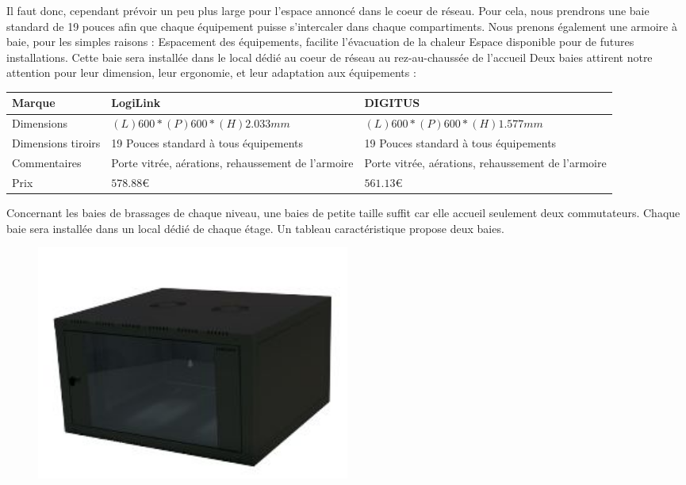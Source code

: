 Il faut donc, cependant prévoir un peu plus large pour l'espace annoncé dans le coeur de réseau. Pour cela, nous prendrons une baie standard de 19 pouces afin que chaque équipement puisse s'intercaler dans chaque compartiments. Nous prenons également une armoire à baie, pour les simples raisons :
Espacement des équipements, facilite l'évacuation de la chaleur
Espace disponible pour de futures installations.
Cette baie sera installée dans le local dédié au coeur de réseau au rez-au-chaussée de l'accueil
Deux baies attirent notre attention pour leur dimension, leur ergonomie, et leur adaptation aux équipements :

    \begin{center}
        \begin{tabular}{|l|p{5cm}|p{5cm}|}
          \hline
            Marque  & LogiLink
    &   DIGITUS
 \\
          \hline
Dimensions
  &
$(L)600 * (P)600 * (H)2.033 mm$
    & $ (L)600 * (P)600 * (H)1.577 mm $

 \\
          \hline
Dimensions tiroirs
  & 19 Pouces standard à tous équipements
    & 19 Pouces standard à tous équipements
 \\
          \hline
            Commentaires   & Porte vitrée, aérations, rehaussement de l'armoire & Porte vitrée, aérations, rehaussement de l'armoire
                  \\
        \hline
            Prix &
$ 578.88 \euro   $
    &
$ 561.13 \euro   $
 \\
          \hline
        \end{tabular}
    \end{center}

Concernant les baies de brassages de chaque niveau, une baies de petite taille suffit car elle accueil seulement deux commutateurs.
Chaque baie sera installée dans un local dédié de chaque étage. Un tableau caractéristique propose deux baies.

\begin{figure}[!ht]
    \center
    \includegraphics[width=0.5\textwidth]{./images/25.png}
\end{figure}


